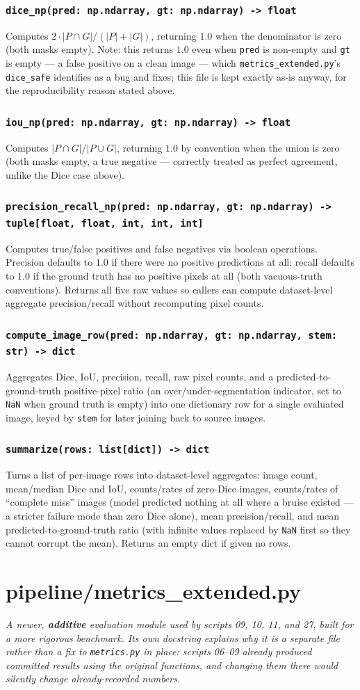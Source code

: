 \documentclass[11pt]{article}
\newcommand{\role}[1]{\par\noindent\textit{#1}\par\vspace{0.5em}}
\newcommand{\func}[1]{\subsubsection*{\texttt{#1}}}
\begin{document}
\func{dice\_np(pred: np.ndarray, gt: np.ndarray) -> float}
Computes $2 \cdot |P \cap G| / (|P| + |G|)$, returning $1.0$ when the
denominator is zero (both masks empty). Note: this returns $1.0$ even when
\texttt{pred} is non-empty and \texttt{gt} is empty --- a false positive on a
clean image --- which \texttt{metrics\_extended.py}'s \texttt{dice\_safe}
identifies as a bug and fixes; this file is kept exactly as-is anyway, for the
reproducibility reason stated above.

\func{iou\_np(pred: np.ndarray, gt: np.ndarray) -> float}
Computes $|P \cap G| / |P \cup G|$, returning $1.0$ by convention when the union
is zero (both masks empty, a true negative --- correctly treated as perfect
agreement, unlike the Dice case above).

\func{precision\_recall\_np(pred: np.ndarray, gt: np.ndarray) -> tuple[float, float, int, int, int]}
Computes true/false positives and false negatives via boolean operations.
Precision defaults to $1.0$ if there were no positive predictions at all;
recall defaults to $1.0$ if the ground truth has no positive pixels at all
(both vacuous-truth conventions). Returns all five raw values so callers can
compute dataset-level aggregate precision/recall without recomputing pixel
counts.

\func{compute\_image\_row(pred: np.ndarray, gt: np.ndarray, stem: str) -> dict}
Aggregates Dice, IoU, precision, recall, raw pixel counts, and a
predicted-to-ground-truth positive-pixel ratio (an over/under-segmentation
indicator, set to \texttt{NaN} when ground truth is empty) into one dictionary
row for a single evaluated image, keyed by \texttt{stem} for later joining back
to source images.

\func{summarize(rows: list[dict]) -> dict}
Turns a list of per-image rows into dataset-level aggregates: image count,
mean/median Dice and IoU, counts/rates of zero-Dice images, counts/rates of
``complete miss'' images (model predicted nothing at all where a bruise
existed --- a stricter failure mode than zero Dice alone), mean precision/recall,
and mean predicted-to-ground-truth ratio (with infinite values replaced by
\texttt{NaN} first so they cannot corrupt the mean). Returns an empty dict if
given no rows.

\newpage
\section{pipeline/metrics\_extended.py}
\role{A newer, \textbf{additive} evaluation module used by scripts 09, 10, 11,
and 27, built for a more rigorous benchmark. Its own docstring explains why it
is a separate file rather than a fix to \texttt{metrics.py} in place: scripts
06--09 already produced committed results using the original functions, and
changing them there would silently change already-recorded numbers.}
\end{document}
